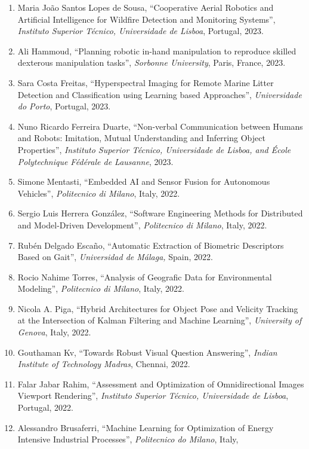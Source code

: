 \begin{enumerate}
\def\labelenumi{\arabic{enumi}.}
\item
  Maria João Santos Lopes de Sousa, ``Cooperative Aerial Robotics and
  Artificial Intelligence for Wildfire Detection and Monitoring
  Systems'', \emph{Instituto Superior Técnico, Universidade de Lisboa},
  Portugal, 2023.
\item
  Ali Hammoud, ``Planning robotic in-hand manipulation to reproduce
  skilled dexterous manipulation tasks'', \emph{Sorbonne University},
  Paris, France, 2023.
\item
  Sara Costa Freitas, ``Hyperspectral Imaging for Remote Marine Litter
  Detection and Classification using Learning based Approaches'',
  \emph{Universidade do Porto}, Portugal, 2023.
\item
  Nuno Ricardo Ferreira Duarte, ``Non-verbal Communication between
  Humans and Robots: Imitation, Mutual Understanding and Inferring
  Object Properties'', \emph{Instituto Superior Técnico, Universidade de
  Lisboa, and École Polytechnique Fédérale de Lausanne}, 2023.
\item
  Simone Mentasti, ``Embedded AI and Sensor Fusion for Autonomous
  Vehicles'', \emph{Politecnico di Milano}, Italy, 2022.
\item
  Sergio Luis Herrera González, ``Software Engineering Methods for
  Distributed and Model-Driven Development'', \emph{Politecnico di
  Milano}, Italy, 2022.
\item
  Rubén Delgado Escaño, ``Automatic Extraction of Biometric Descriptors
  Based on Gait'', \emph{Universidad de Málaga,} Spain, 2022.
\item
  Rocio Nahime Torres, ``Analysis of Geografic Data for Environmental
  Modeling'', \emph{Politecnico di Milano}, Italy, 2022.
\item
  Nicola A. Piga, ``Hybrid Architectures for Object Pose and Velicity
  Tracking at the Intersection of Kalman Filtering and Machine
  Learning'', \emph{University of Genova}, Italy, 2022.
\item
  Gouthaman Kv, ``Towards Robust Visual Question Answering'',
  \emph{Indian Institute of Technology Madras}, Chennai, 2022.
\item
  Falar Jabar Rahim, ``Assessment and Optimization of Omnidirectional
  Images Viewport Rendering'', \emph{Instituto Superior Técnico,
  Universidade de Lisboa}, Portugal, 2022.
\item
  Alessandro Brusaferri, ``Machine Learning for Optimization of Energy
  Intensive Industrial Processes'', \emph{Politecnico do Milano}, Italy,

\end{enumerate}
